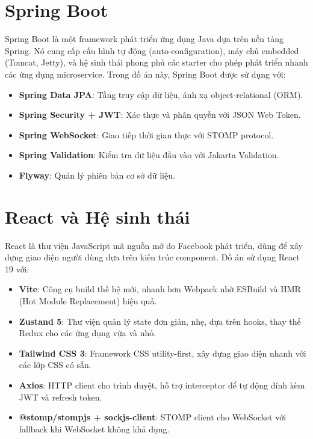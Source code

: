 \documentclass[12pt,a4paper]{report}
\begin{document}
\section{Spring Boot}

Spring Boot là một framework phát triển ứng dụng Java dựa trên nền tảng Spring. Nó cung cấp cấu hình tự động (auto-configuration), máy chủ embedded (Tomcat, Jetty), và hệ sinh thái phong phú các starter cho phép phát triển nhanh các ứng dụng microservice. Trong đồ án này, Spring Boot được sử dụng với:

\begin{itemize}
    \item \textbf{Spring Data JPA}: Tầng truy cập dữ liệu, ánh xạ object-relational (ORM).
    \item \textbf{Spring Security + JWT}: Xác thực và phân quyền với JSON Web Token.
    \item \textbf{Spring WebSocket}: Giao tiếp thời gian thực với STOMP protocol.
    \item \textbf{Spring Validation}: Kiểm tra dữ liệu đầu vào với Jakarta Validation.
    \item \textbf{Flyway}: Quản lý phiên bản cơ sở dữ liệu.
\end{itemize}

\section{React và Hệ sinh thái}

React là thư viện JavaScript mã nguồn mở do Facebook phát triển, dùng để xây dựng giao diện người dùng dựa trên kiến trúc component. Đồ án sử dụng React 19 với:

\begin{itemize}
    \item \textbf{Vite}: Công cụ build thế hệ mới, nhanh hơn Webpack nhờ ESBuild và HMR (Hot Module Replacement) hiệu quả.
    \item \textbf{Zustand 5}: Thư viện quản lý state đơn giản, nhẹ, dựa trên hooks, thay thế Redux cho các ứng dụng vừa và nhỏ.
    \item \textbf{Tailwind CSS 3}: Framework CSS utility-first, xây dựng giao diện nhanh với các lớp CSS có sẵn.
    \item \textbf{Axios}: HTTP client cho trình duyệt, hỗ trợ interceptor để tự động đính kèm JWT và refresh token.
    \item \textbf{@stomp/stompjs + sockjs-client}: STOMP client cho WebSocket với fallback khi WebSocket không khả dụng.
\end{itemize}
\end{document}
